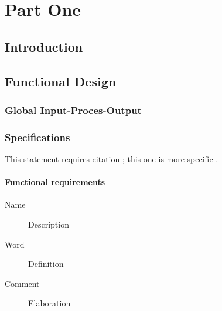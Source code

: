 \documentclass[11pt,fleqn]{book} %
\begin{document}

\pagestyle{empty} %

\tableofcontents %

\cleardoublepage %

\pagestyle{fancy} %

\newpage
\part{Part One}

\chapter{Introduction}
\lipsum[3-5]



\chapter{Functional Design}

\section{Global Input-Proces-Output}

\lipsum[1-7] %

\section{Specifications}

This statement requires citation \cite{book_key}; this one is more specific \cite[122]{article_key}.
\subsection{Functional requirements}
\begin{description}
	\item[Name] Description
	\item[Word] Definition
	\item[Comment] Elaboration
\end{description}
\end{document}

